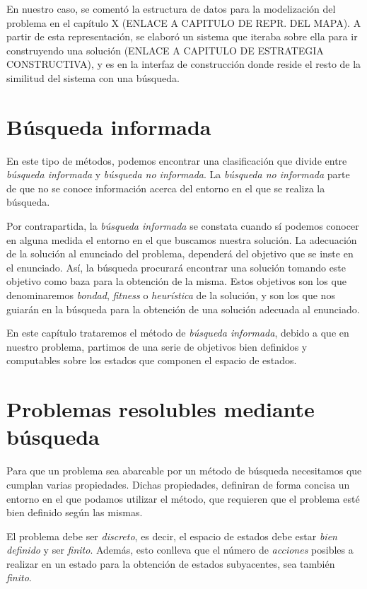 En nuestro caso, se comentó la estructura de datos para la modelización del problema en el capítulo X (ENLACE A CAPITULO DE REPR. DEL MAPA). A partir de esta representación, se elaboró un sistema que iteraba sobre ella para ir construyendo una solución (ENLACE A CAPITULO DE ESTRATEGIA CONSTRUCTIVA), y es en la interfaz de construcción donde reside el resto de la similitud del sistema con una búsqueda.

\section{Búsqueda informada}

En este tipo de métodos, podemos encontrar una clasificación que divide entre \emph{búsqueda informada} y \emph{búsqueda no informada}. La \emph{búsqueda no informada} parte de que no se conoce información acerca del entorno en el que se realiza la búsqueda.

Por contrapartida, la \emph{búsqueda informada} se constata cuando sí podemos conocer en alguna medida el entorno en el que buscamos nuestra solución. La adecuación de la solución al enunciado del problema, dependerá del objetivo que se inste en el enunciado. Así, la búsqueda procurará encontrar una solución tomando este objetivo como baza para la obtención de la misma. Estos objetivos son los que denominaremos \emph{bondad}, \emph{fitness} o \emph{heurística} de la solución, y son los que nos guiarán en la búsqueda para la obtención de una solución adecuada al enunciado.

En este capítulo trataremos el método de \emph{búsqueda informada}, debido a que en nuestro problema, partimos de una serie de objetivos bien definidos y computables sobre los estados que componen el espacio de estados.

\section{Problemas resolubles mediante búsqueda}

Para que un problema sea abarcable por un método de búsqueda necesitamos que cumplan varias propiedades. Dichas propiedades, definiran de forma concisa un entorno en el que podamos utilizar el método, que requieren que el problema esté bien definido según las mismas.

El problema debe ser \emph{discreto}, es decir, el espacio de estados debe estar \emph{bien definido} y ser \emph{finito}. Además, esto conlleva que el número de \emph{acciones} posibles a realizar en un estado para la obtención de estados subyacentes, sea también \emph{finito}.

